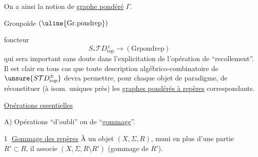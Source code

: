 On a ainsi la notion de \uline{graphe pondéré}   $\Gamma$.


Groupoïde $(\uline{\mathrm{Gr.pondrep}})$

foncteur
\[
 S_*\mathcal TD_{\mathrm{top}}^\pm\longrightarrow(\mathrm{Grpondrep})
\]
qui sera important sans doute dans l'explicitation de l'opération de ``recollement''.
Il est clair en tous cas que toute description algébrico-combinatoire de
$\unsure{S\mathcal TD_{\mathrm{top}}^\pm}$ devra permettre, pour chaque objet de
 paradigme, de réconstituer (à isom. uniques près) les \uline{graphes pondérés à repères} correspondants.

\uline{Opérations essentielles}

A) Opérations ``d'oubli'' ou de ``\uline{gommage}''.

\textcircled{1} \uline{Gommage des repères} À un objet $(X,\Sigma,R)$, muni en plus d'une partie $R'\subset R$, il associe $(X,\Sigma,R\setminus R')$ (gommage de $R'$).

